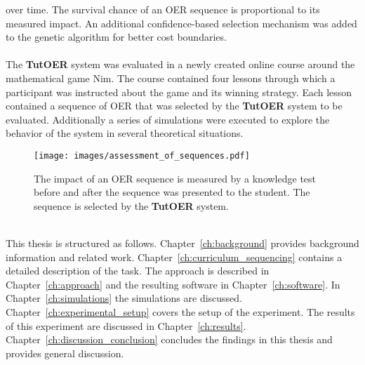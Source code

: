 over time. The survival chance of an OER sequence is proportional to its
measured impact. An additional confidence-based selection mechanism was added
to the genetic algorithm for better cost boundaries.\\\\
\noindent
The \textbf{TutOER} system was evaluated in a newly created online course around
the mathematical game Nim. The course contained four lessons through which a
participant was instructed about the game and its winning strategy. Each lesson
contained a sequence of OER that was selected by the \textbf{TutOER} system to be
evaluated. Additionally a series of simulations were executed to explore
the behavior of the system in several theoretical situations.\\
\begin{figure}[h!]
	\begin{framed}
	\centering
	\texttt{[image: images/assessment\_of\_sequences.pdf]}
	\caption[Setup of assessments of impact OER]{The impact of an OER sequence
		is measured by a knowledge test before and after the
	sequence was presented to the student. The sequence is selected by the
	\textbf{TutOER} system.}
	\label{fig:assessment_of_sequences}
	\end{framed}
\end{figure}\\
\noindent
This thesis is structured as follows. Chapter~\ref{ch:background} provides
background information and related work. Chapter~\ref{ch:curriculum_sequencing}
contains a detailed description of the task. The approach is described in
Chapter~\ref{ch:approach} and the resulting software in
Chapter~\ref{ch:software}. In Chapter~\ref{ch:simulations} the simulations are
discussed. Chapter~\ref{ch:experimental_setup} covers the setup
of the experiment. The results of this experiment are discussed in
Chapter~\ref{ch:results}. Chapter~\ref{ch:discussion_conclusion} concludes the
findings in this thesis and provides general discussion.

